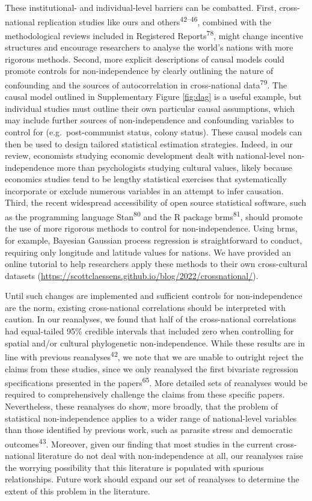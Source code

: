 \documentclass[
  man,floatsintext]{apa6}
\begin{document}
These institutional- and individual-level barriers can be combatted. First, cross-national replication studies like ours and others\textsuperscript{42--46}, combined with the methodological reviews included in Registered Reports\textsuperscript{78}, might change incentive structures and encourage researchers to analyse the world's nations with more rigorous methods. Second, more explicit descriptions of causal models could promote controls for non-independence by clearly outlining the nature of confounding and the sources of autocorrelation in cross-national data\textsuperscript{79}. The causal model outlined in Supplementary Figure \ref{fig:dag} is a useful example, but individual studies must outline their own particular causal assumptions, which may include further sources of non-independence and confounding variables to control for (e.g.~post-communist status, colony status). These causal models can then be used to design tailored statistical estimation strategies. Indeed, in our review, economists studying economic development dealt with national-level non-independence more than psychologists studying cultural values, likely because economics studies tend to be lengthy statistical exercises that systematically incorporate or exclude numerous variables in an attempt to infer causation. Third, the recent widespread accessibility of open source statistical software, such as the programming language Stan\textsuperscript{80} and the R package brms\textsuperscript{81}, should promote the use of more rigorous methods to control for non-independence. Using brms, for example, Bayesian Gaussian process regression is straightforward to conduct, requiring only longitude and latitude values for nations. We have provided an online tutorial to help researchers apply these methods to their own cross-cultural datasets (\url{https://scottclaessens.github.io/blog/2022/crossnational/}).

Until such changes are implemented and sufficient controls for non-independence are the norm, existing cross-national correlations should be interpreted with caution. In our reanalyses, we found that half of the cross-national correlations had equal-tailed 95\% credible intervals that included zero when controlling for spatial and/or cultural phylogenetic non-independence. While these results are in line with previous reanalyses\textsuperscript{42}, we note that we are unable to outright reject the claims from these studies, since we only reanalysed the first bivariate regression specifications presented in the papers\textsuperscript{65}. More detailed sets of reanalyses would be required to comprehensively challenge the claims from these specific papers. Nevertheless, these reanalyses do show, more broadly, that the problem of statistical non-independence applies to a wider range of national-level variables than those identified by previous work, such as parasite stress and democratic outcomes\textsuperscript{43}. Moreover, given our finding that most studies in the current cross-national literature do not deal with non-independence at all, our reanalyses raise the worrying possibility that this literature is populated with spurious relationships. Future work should expand our set of reanalyses to determine the extent of this problem in the literature.
\end{document}
